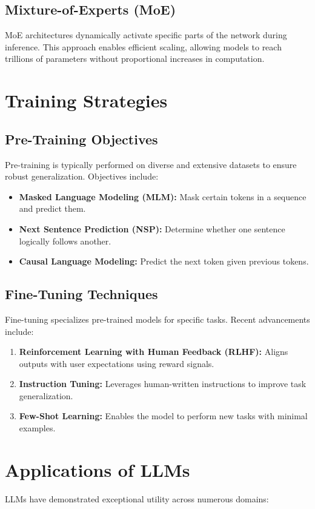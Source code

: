 \documentclass[12pt]{article}
\begin{document}
\subsection{Mixture-of-Experts (MoE)}
MoE architectures dynamically activate specific parts of the network during inference. This approach enables efficient scaling, allowing models to reach trillions of parameters without proportional increases in computation.

\section{Training Strategies}
\subsection{Pre-Training Objectives}
Pre-training is typically performed on diverse and extensive datasets to ensure robust generalization. Objectives include:
\begin{itemize}
    \item \textbf{Masked Language Modeling (MLM):} Mask certain tokens in a sequence and predict them.
    \item \textbf{Next Sentence Prediction (NSP):} Determine whether one sentence logically follows another.
    \item \textbf{Causal Language Modeling:} Predict the next token given previous tokens.
\end{itemize}

\subsection{Fine-Tuning Techniques}
Fine-tuning specializes pre-trained models for specific tasks. Recent advancements include:
\begin{enumerate}
    \item \textbf{Reinforcement Learning with Human Feedback (RLHF):} Aligns outputs with user expectations using reward signals.
    \item \textbf{Instruction Tuning:} Leverages human-written instructions to improve task generalization.
    \item \textbf{Few-Shot Learning:} Enables the model to perform new tasks with minimal examples.
\end{enumerate}

\section{Applications of LLMs}
LLMs have demonstrated exceptional utility across numerous domains:
\end{document}
